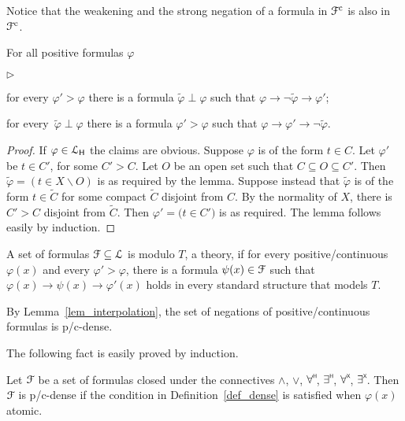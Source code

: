 \documentclass{amsproc}
\newcommand{\mylabel}[1]{{#1}\hfill}
\renewenvironment{itemize}
  {\begin{list}{$\triangleright$}{%
  \setlength{\parskip}{0mm}
  \setlength{\topsep}{.4\baselineskip}
  \setlength{\rightmargin}{0mm}
  \setlength{\listparindent}{0mm}
  \setlength{\itemindent}{0mm}
  \setlength{\labelwidth}{3ex}
  \setlength{\itemsep}{.2\baselineskip}
  \setlength{\parsep}{.2\baselineskip}
  \setlength{\partopsep}{0mm}
  \setlength{\labelsep}{1ex}
  \setlength{\leftmargin}{\labelwidth+\labelsep}
  \let\makelabel\mylabel}}{%
\end{list}}
\renewcommand*{\emph}[1]{%
   \smash{\tikz[baseline]\node[rectangle, fill=teal!25, rounded corners, inner xsep=0.5ex, inner ysep=0.2ex, anchor=base, minimum height = 2.7ex]{\strut #1};}}
\begin{document}
Notice that the weakening and the strong negation of a formula in ${\EuScript F}^{\rm c}$ is also in ${\EuScript F}^{\rm c}$.

\begin{lemma}\label{lem_interpolation}
  For all positive formulas $\varphi$
  \begin{itemize}
    \item[1.]for every $\varphi'>\varphi$ there is a formula $\tilde\varphi\perp\varphi$ such that $\varphi\rightarrow\neg \tilde\varphi\rightarrow\varphi'$;
    \item[2.] for every\, $\tilde\varphi\perp\varphi$ there is a formula $\varphi'>\varphi$ such that  $\varphi\rightarrow\varphi'\rightarrow\neg \tilde\varphi$.
  \end{itemize}
\end{lemma}

\begin{proof}
  If $\varphi\in {\EuScript L}_{\sf H}$ the claims are obvious.
  Suppose $\varphi$ is of the form $t\in C$.
  Let $\varphi'$ be $t\in C'$, for some $C'>C$.
  Let $O$ be an open set such that $C\subseteq O\subseteq C'$.
  Then $\tilde\varphi=(t\in X\smallsetminus O)$ is as required by the lemma.
  Suppose instead that $\tilde\varphi$ is of the form $t\in\tilde{C}$ for some compact $\tilde{C}$ disjoint from $C$.
  By the normality of $X$, there is  $C'>C$ disjoint from $\tilde{C}$.
  Then  $\varphi'=\big(t\in C'\big)$ is as required.
  The lemma follows easily by induction.
\end{proof}

\begin{definition}\label{def_dense}
  A set of formulas ${\EuScript F}\subseteq{\EuScript L}$ is \emph{p/c-dense\/} modulo $T$, a theory, if for every positive/continuous $\varphi(x)$ and every $\varphi'>\varphi$, there is a formula $\psi(x)\in{\EuScript F}$ such that $\varphi(x)\rightarrow\psi(x)\rightarrow\varphi'(x)$ holds in every standard structure that models $T$.
\end{definition}

\begin{example}
  By Lemma~\ref{lem_interpolation}, the set of negations of positive/continuous formulas is p/c-dense.
\end{example}

The following fact is easily proved by induction.

\begin{fact}
  Let ${\EuScript F}$ be a set of formulas closed under the connectives $\wedge$, $\vee$, $\forall\raisebox{1.1ex}{\scaleto{\sf H}{.8ex}\kern-.2ex}$, $\exists\raisebox{1.1ex}{\scaleto{\sf H}{.8ex}\kern-.2ex}$, $\forall\raisebox{1.1ex}{\scaleto{\sf X}{.8ex}\kern-.2ex}$, $\exists\raisebox{1.1ex}{\scaleto{\sf X}{.8ex}\kern-.2ex}$.
  Then ${\EuScript F}$ is p/c-dense if the condition in Definition~\ref{def_dense} is satisfied when $\varphi(x)$ atomic.
\end{fact}
\end{document}
